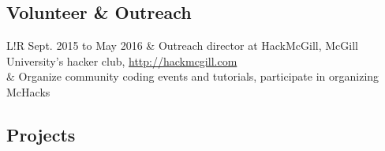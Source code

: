 \documentclass{article}
\newcommand\VRule{\color{lightgray}\vrule width 0.5pt}
\begin{document}
\subsection*{Volunteer \& Outreach}

\begin{tabular}[h]{L!{\VRule}R}
    Sept. 2015 to May 2016
        & Outreach director at HackMcGill, McGill University's hacker club,
            \url{http://hackmcgill.com} \\
        & Organize community coding events and tutorials, participate in organizing McHacks
\end{tabular}

\subsection*{Projects}
\end{document}

